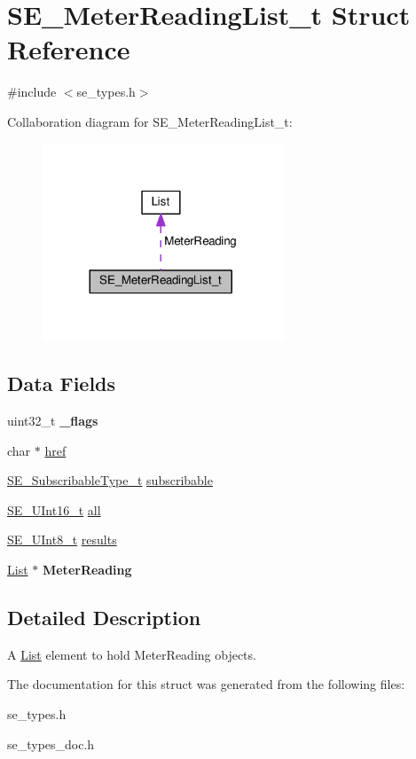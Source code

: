 \hypertarget{structSE__MeterReadingList__t}{}\section{S\+E\+\_\+\+Meter\+Reading\+List\+\_\+t Struct Reference}
\label{structSE__MeterReadingList__t}


{\ttfamily \#include $<$se\+\_\+types.\+h$>$}



Collaboration diagram for S\+E\+\_\+\+Meter\+Reading\+List\+\_\+t\+:\nopagebreak
\begin{figure}[H]
\begin{center}
\leavevmode
\includegraphics[width=204pt]{structSE__MeterReadingList__t__coll__graph}
\end{center}
\end{figure}
\subsection*{Data Fields}
\begin{DoxyCompactItemize}
\item 
uint32\+\_\+t {\bfseries \+\_\+flags}
\item 
char $\ast$ \hyperlink{group__MeterReadingList_ga9844ad12c7c11e9daaf78abd11948bd3}{href}
\item 
\hyperlink{group__SubscribableType_ga5c41f553d369710ed34619266bf2551e}{S\+E\+\_\+\+Subscribable\+Type\+\_\+t} \hyperlink{group__MeterReadingList_gaa6c784a3bde1acd210ee5d07f3b7ea78}{subscribable}
\item 
\hyperlink{group__UInt16_gac68d541f189538bfd30cfaa712d20d29}{S\+E\+\_\+\+U\+Int16\+\_\+t} \hyperlink{group__MeterReadingList_ga1df1d199c933bf4041cf48a30b078075}{all}
\item 
\hyperlink{group__UInt8_gaf7c365a1acfe204e3a67c16ed44572f5}{S\+E\+\_\+\+U\+Int8\+\_\+t} \hyperlink{group__MeterReadingList_gaa8caed66ab18310024f727817493b458}{results}
\item 
\hyperlink{structList}{List} $\ast$ {\bfseries Meter\+Reading}
\end{DoxyCompactItemize}


\subsection{Detailed Description}
A \hyperlink{structList}{List} element to hold Meter\+Reading objects. 

The documentation for this struct was generated from the following files\+:\begin{DoxyCompactItemize}
\item 
se\+\_\+types.\+h\item 
se\+\_\+types\+\_\+doc.\+h\end{DoxyCompactItemize}
